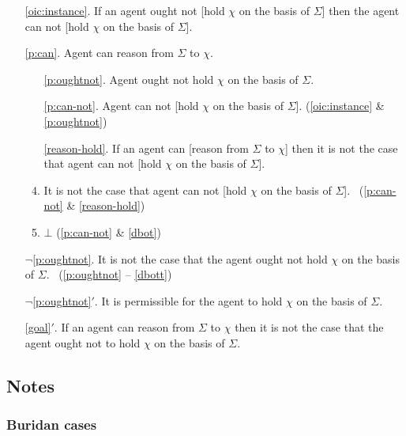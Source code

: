 \documentclass[10pt]{article}
\begin{document}
\begin{enumerate}
\item[\ref{oic:instance}.] If an agent ought not [hold \(\chi\) on the basis of \(\Sigma\)] then the agent can not [hold \(\chi\) on the basis of \(\Sigma\)].
\item[\ref{p:can}.] Agent can reason from \(\Sigma\) to \(\chi\).
  \begin{enumerate}[ref=\alph*.]
  \item[\ref{p:oughtnot}.] Agent ought not hold \(\chi\) on the basis of \(\Sigma\).
  \item[\ref{p:can-not}.] Agent can not [hold \(\chi\) on the basis of \(\Sigma\)]. \hfill (\ref{oic:instance} \& \ref{p:oughtnot})
  \item[\ref{reason-hold}.] If an agent can [reason from \(\Sigma\) to \(\chi\)] then it is not the case that agent can not [hold \(\chi\) on the basis of \(\Sigma\)].
  \item\label{dbot} It is not the case that agent can not [hold \(\chi\) on the basis of \(\Sigma\)].\linebreak
  \mbox{ }\hfill (\ref{p:can-not} \& \ref{reason-hold})
  \item\label{dbott} \(\bot\) \hfill (\ref{p:can-not} \& \ref{dbot})
  \end{enumerate}
\item[\(\lnot\)\ref{p:oughtnot}.] It is not the case that the agent ought not hold \(\chi\) on the basis of \(\Sigma\).\linebreak
  \mbox{ }\hfill (\ref{p:oughtnot} -- \ref{dbott})
\item[\(\lnot\)\ref{p:oughtnot}\('\).] It is permissible for the agent to hold \(\chi\) on the basis of \(\Sigma\).
\end{enumerate}

\begin{enumerate}
\item[\ref{goal}\('\).] If an agent can reason from \(\Sigma\) to \(\chi\) then it is not the case that the agent ought not to hold \(\chi\) on the basis of \(\Sigma\).
\end{enumerate}

\subsection{Notes}
\label{sec:notes-1}

\subsubsection{Buridan cases}
\label{sec:buridan-cases}
\end{document}
